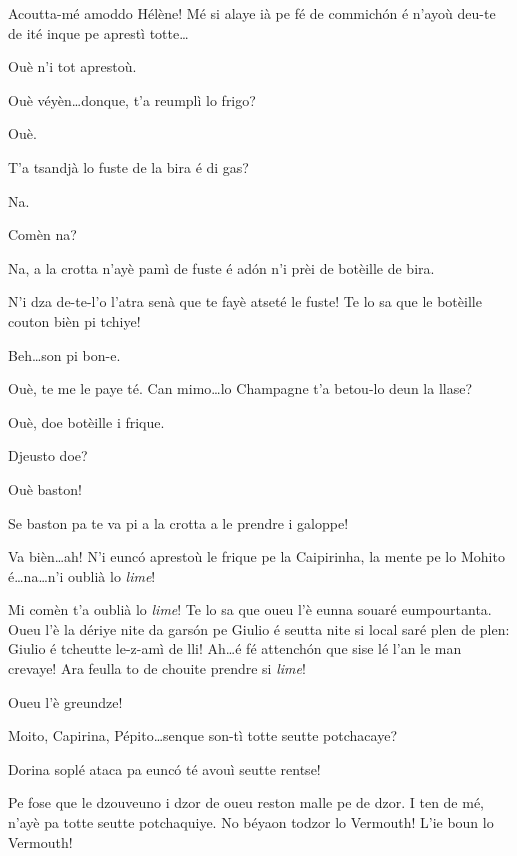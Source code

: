 \begin{drama}
\Bertaspeaks Acoutta-mé amoddo Hélène! Mé si alaye ià pe fé de commich\'on é n'ayoù deu-te de ité inque pe aprestì totte\ldots

\Helenespeaks Ouè n'i tot aprestoù.

\Bertaspeaks Ouè véyèn\ldots donque, t'a reumplì lo frigo?

\Helenespeaks Ouè.

\Bertaspeaks T'a tsandjà lo fuste de la bira é di gas?

\Helenespeaks Na. 

\Bertaspeaks Comèn na?

\Helenespeaks Na, a la crotta n'ayè pamì de fuste é ad\'on n'i prèi de botèille de bira.

\Bertaspeaks N'i dza de-te-l'o l'atra senà que te fayè atseté le fuste! Te lo sa que le botèille couton bièn pi tchiye!

\Helenespeaks{} Beh\ldots son pi bon-e.

\Bertaspeaks Ouè, te me le paye té. Can mimo\ldots lo Champagne t'a betou-lo deun la llase? 

\Helenespeaks{} Ouè, doe botèille i frique.

\Bertaspeaks Djeusto doe?

\Helenespeaks Ouè baston!

\Bertaspeaks Se baston pa te va pi a la crotta a le prendre i galoppe!

\Helenespeaks Va bièn\ldots ah! N'i eunc\'o aprestoù le frique pe la Caipirinha, la mente pe lo Mohito é\ldots na\ldots n'i oublià lo \textit{lime}!

\Bertaspeaks{} Mi comèn t'a oublià lo \textit{lime}! Te lo sa que oueu l'è eunna souaré eumpourtanta. Oueu l'è la dériye nite da gars\'on pe Giulio é seutta nite si local saré plen de plen: Giulio é tcheutte le-z-amì de lli! Ah\ldots é fé attench\'on que sise lé l'an le man crevaye! Ara feulla to de chouite prendre si \textit{lime}!


\Dorinaspeaks{} Oueu l'è greundze!

\Dorinaspeaks{} Moito, Capirina, Pépito\ldots senque son-tì totte seutte potchacaye?

\Bertaspeaks Dorina soplé ataca pa eunc\'o té avouì seutte rentse!

\Dorinaspeaks Pe fose que le dzouveuno i dzor de oueu reston malle pe de dzor. I ten de mé, n'ayè pa totte seutte potchaquiye. No béyaon todzor lo Vermouth! L'ie boun lo Vermouth!


\end{drama}
